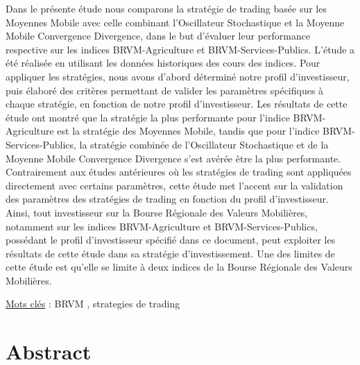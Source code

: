 Dans le présente étude nous comparons la stratégie de trading basée sur
les Moyennes Mobile avec celle combinant l'Oscillateur Stochastique et
la Moyenne Mobile Convergence Divergence, dans le but d'évaluer leur
performance respective sur les indices BRVM-Agriculture et
BRVM-Services-Publics. L'étude a été réalisée en utilisant les données
historiques des cours des indices. Pour appliquer les stratégies, nous
avons d'abord déterminé notre profil d'investisseur, puis élaboré des
critères permettant de valider les paramètres spécifiques à chaque
stratégie, en fonction de notre profil d'investisseur. Les résultats de
cette étude ont montré que la stratégie la plus performante pour
l'indice BRVM-Agriculture est la stratégie des Moyennes Mobile, tandis
que pour l'indice BRVM-Services-Publics, la stratégie combinée de
l'Oscillateur Stochastique et de la Moyenne Mobile Convergence
Divergence s'est avérée être la plus performante. Contrairement aux
études antérieures où les stratégies de trading sont appliquées
directement avec certains paramètres, cette étude met l'accent sur la
validation des paramètres des stratégies de trading en fonction du
profil d'investisseur. Ainsi, tout investisseur sur la Bourse Régionale
des Valeurs Mobilières, notamment sur les indices BRVM-Agriculture et
BRVM-Services-Publics, possédant le profil d'investisseur spécifié dans
ce document, peut exploiter les résultats de cette étude dans sa
stratégie d'investissement. Une des limites de cette étude est qu'elle
se limite à deux indices de la Bourse Régionale des Valeurs Mobilières.

\ul{Mots clés} : BRVM , strategies de trading

\section*{Abstract}\label{abstract}

